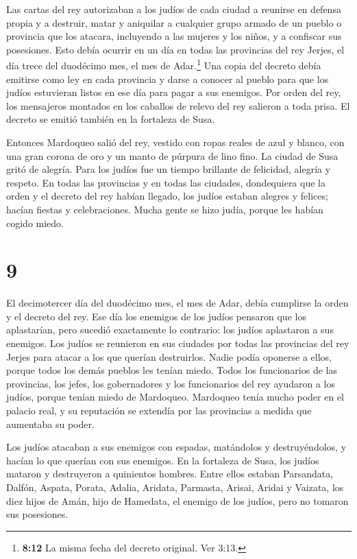  Las cartas del rey autorizaban a los judíos de cada ciudad
a reunirse en defensa propia y a destruir, matar y aniquilar a cualquier
grupo armado de un pueblo o provincia que los atacara, incluyendo a las
mujeres y los niños, y a confiscar sus posesiones.  Esto
debía ocurrir en un día en todas las provincias del rey Jerjes, el día
trece del duodécimo mes, el mes de Adar.\footnote{\textbf{8:12} La misma
  fecha del decreto original. Ver 3:13.}  Una copia del
decreto debía emitirse como ley en cada provincia y darse a conocer al
pueblo para que los judíos estuvieran listos en ese día para pagar a sus
enemigos.  Por orden del rey, los mensajeros montados en
los caballos de relevo del rey salieron a toda prisa. El decreto se
emitió también en la fortaleza de Susa.

 Entonces Mardoqueo salió del rey, vestido con ropas reales
de azul y blanco, con una gran corona de oro y un manto de púrpura de
lino fino. La ciudad de Susa gritó de alegría.  Para los
judíos fue un tiempo brillante de felicidad, alegría y respeto.
 En todas las provincias y en todas las ciudades,
dondequiera que la orden y el decreto del rey habían llegado, los judíos
estaban alegres y felices; hacían fiestas y celebraciones. Mucha gente
se hizo judía, porque les habían cogido miedo.

\hypertarget{section-8}{%
\section{9}\label{section-8}}

 El decimotercer día del duodécimo mes, el mes de Adar,
debía cumplirse la orden y el decreto del rey. Ese día los enemigos de
los judíos pensaron que los aplastarían, pero sucedió exactamente lo
contrario: los judíos aplastaron a sus enemigos.  Los judíos
se reunieron en sus ciudades por todas las provincias del rey Jerjes
para atacar a los que querían destruirlos. Nadie podía oponerse a ellos,
porque todos los demás pueblos les tenían miedo.  Todos los
funcionarios de las provincias, los jefes, los gobernadores y los
funcionarios del rey ayudaron a los judíos, porque tenían miedo de
Mardoqueo.  Mardoqueo tenía mucho poder en el palacio real,
y su reputación se extendía por las provincias a medida que aumentaba su
poder.

 Los judíos atacaban a sus enemigos con espadas, matándolos
y destruyéndolos, y hacían lo que querían con sus enemigos. 
En la fortaleza de Susa, los judíos mataron y destruyeron a quinientos
hombres.  Entre ellos estaban Parsandata, Dalfón, Aspata,
 Porata, Adalia, Aridata,  Parmasta, Arisai,
Aridai y Vaizata,  los diez hijos de Amán, hijo de
Hamedata, el enemigo de los judíos, pero no tomaron sus posesiones.

